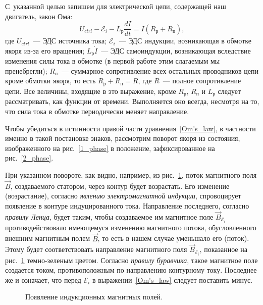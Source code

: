 \documentclass[12pt, a4paper, openany]{extarticle}
\begin{document}
С~указанной целью запишем для электрической цепи, содержащей наш двигатель, закон Ома:
\begin{equation}\label{Om's_law}
	U_{ctrl} - \mathcal E_i - L_\textit{р}\frac{dI}{dt} = I\left(R_\textit{р} + R_\textit{п}\right),
\end{equation}
где $U_{ctrl}$~--- ЭДС источника тока; $\mathcal E_i$~--- ЭДС индукции, возникающая в обмотке якоря из-за его вращения; $L_\textit{р}\dot{I}$~--- ЭДС самоиндукции, возникающая вследствие изменения силы тока в обмотке (в первой работе этим слагаемым мы пренебрегли); $R_\textit{п}$~--- суммарное сопротивление всех остальных проводников цепи кроме обмотки якоря, то есть $R_\textit{р} + R_\textit{п} = R$, где $R$~--- полное сопротивление цепи.
Все величины, входящие в это выражение, кроме $R_\textit{р}$, $R_\textit{п}$ и $L_\textit{р}$ следует рассматривать, как функции от времени. 
Выполняется оно всегда, несмотря на то, что сила тока в обмотке периодически меняет направление.

Чтобы убедиться в истинности правой части уравнения~\eqref{Om's_law}, в частности именно в такой постановке знаков, рассмотрим поворот якоря из состояния, изображенного на рис.~\ref{1_phase} в положение, зафиксированное на рис.~\ref{2_phase}.

При указанном повороте, как видно, например, из рис.~\ref{inductions}, поток магнитного поля $\vec B$, создаваемого статором, через контур будет возрастать.
Его изменение (возрастание), согласно \textit{явлению электромагнитной индукции}, спровоцирует появление в контуре индуцированного тока.
Направление последнего, согласно \textit{правилу Ленца}, будет таким, чтобы создаваемое им магнитное поле $\vec B_{\mathcal{E}_i}$ противодействовало имеющемуся изменению магнитного потока, обусловленного внешним магнитным полем $\vec B$, то есть в нашем случае уменьшало его (поток).
Этому будет соответствовать направление магнитного поля $\vec B_{\mathcal{E}_i}$, показанное на рис.~\ref{inductions} темно-зеленым цветом.
Согласно \textit{правилу буравчика}, такое магнитное поле создается током, противоположным по направлению контурному току.
Последнее же и означает, что перед $\mathcal E_i$ в выражении~\eqref{Om's_law} следует поставить минус.

\begin{figure}[h]
	\noindent{}
	\caption{Появление индукционных магнитных полей.}
	\label{inductions}
\end{figure}
\end{document}
